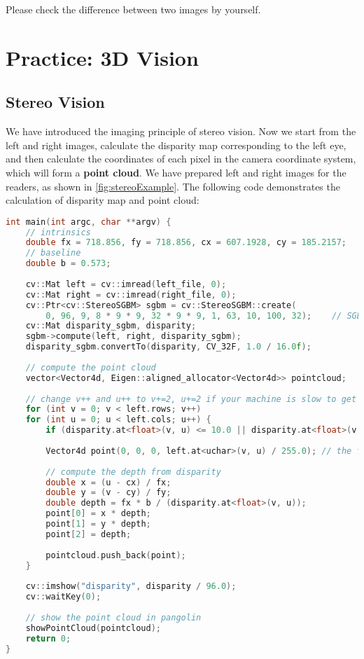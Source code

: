Please check the difference between two images by yourself.

\section{Practice: 3D Vision}
\subsection{Stereo Vision}
We have introduced the imaging principle of stereo vision. Now we start from the left and right images, calculate the disparity map corresponding to the left eye, and then calculate the coordinates of each pixel in the camera coordinate system, which will form a \textbf{point cloud}. We have prepared left and right images for the readers, as shown in \autoref {fig:stereoExample}. The following code demonstrates the calculation of disparity map and point cloud:

\begin{lstlisting}[language=C++,caption=slambook/ch5/stereoVision/stereoVision.cpp (Part)]
int main(int argc, char **argv) {
    // intrinsics
    double fx = 718.856, fy = 718.856, cx = 607.1928, cy = 185.2157;
    // baseline
    double b = 0.573;
    
    cv::Mat left = cv::imread(left_file, 0);
    cv::Mat right = cv::imread(right_file, 0);
    cv::Ptr<cv::StereoSGBM> sgbm = cv::StereoSGBM::create(
        0, 96, 9, 8 * 9 * 9, 32 * 9 * 9, 1, 63, 10, 100, 32);    // SGBM is senstive to parameters
    cv::Mat disparity_sgbm, disparity;
    sgbm->compute(left, right, disparity_sgbm);
    disparity_sgbm.convertTo(disparity, CV_32F, 1.0 / 16.0f);
    
    // compute the point cloud
    vector<Vector4d, Eigen::aligned_allocator<Vector4d>> pointcloud;
    
    // change v++ and u++ to v+=2, u+=2 if your machine is slow to get a sparser cloud
    for (int v = 0; v < left.rows; v++)
    for (int u = 0; u < left.cols; u++) {
        if (disparity.at<float>(v, u) <= 10.0 || disparity.at<float>(v, u) >= 96.0) continue;
        
        Vector4d point(0, 0, 0, left.at<uchar>(v, u) / 255.0); // the first three dimensions are xyz, the 4-th is the color
        
        // compute the depth from disparity
        double x = (u - cx) / fx;
        double y = (v - cy) / fy;
        double depth = fx * b / (disparity.at<float>(v, u));
        point[0] = x * depth;
        point[1] = y * depth;
        point[2] = depth;
        
        pointcloud.push_back(point);
    }
    
    cv::imshow("disparity", disparity / 96.0);
    cv::waitKey(0);
    
    // show the point cloud in pangolin
    showPointCloud(pointcloud);
    return 0;
}
\end{lstlisting}

